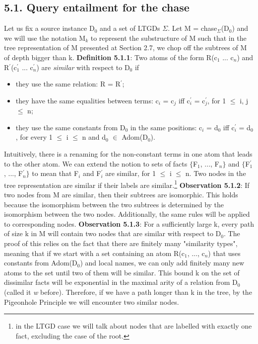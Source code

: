 \documentclass[11pt, a4paper, dvipsnames]{article}
\begin{document}
\subsection{5.1. Query entailment for the chase}
Let us fix a source instance D$_{0}$ and a set of LTGDs $\Sigma$. Let M = chase$_{\Sigma}$(D$_{0}$) and we will use the notation M$_{k}$ to represent the substructure of M such that in the tree representation of M presented at Section 2.7, we chop off the subtrees of M of depth bigger than k.\newline
\textbf{Definition 5.1.1}: Two atoms of the form R(c$_{1}$ ... c$_{n}$) and R$^{'}$(c$^{'}_{1}$ ... c$^{'}_{n}$) are \textit{similar} with respect to D$_{0}$ if
\begin{itemize}
	\item they use the same relation: R = R$^{'}$;
	\item they have the same equalities between terms: c$_{i}$ = c$_{j}$ iff c$^{'}_{i}$ = c$^{'}_{j}$, for 1 $\leq$ i, j $\leq$ n;
	\item they use the same constants from D$_{0}$ in the same positions: c$_{i}$ = d$_{0}$ iff c$^{'}_{i}$ = d$_{0}$, for every 1 $\leq$ i $\leq$ n and d$_{0}$ $\in$ Adom(D$_{0}$).
\end{itemize} 
Intuitively, there is a renaming for the non-constant terms in one atom that leads to the other atom. We can extend the notion to sets of facts $\{$F$_{1}$, ..., F$_{n}\}$ and $\{$F$^{'}_{1}$, ..., F$^{'}_{n}\}$ to mean that F$_{i}$ and F$^{'}_{i}$ are similar, for 1 $\leq$ i $\leq$ n. Two nodes in the tree representation are similar if their labels are similar.\footnote{in the LTGD case we will talk about nodes that are labelled with exactly one fact, excluding the case of the root.}\newline
\textbf{Observation 5.1.2}: If two nodes from M are similar, then their subtrees are isomorphic.\newline
This holds because the isomorphism between the two subtrees is determined by the isomorphism between the two nodes. Additionally, the same rules will be applied to corresponding nodes.\newline
\textbf{Observation 5.1.3}: For a sufficiently large k, every path of size k in M will contain two nodes that are similar with respect to D$_{0}$.\newline
The proof of this relies on the fact that there are finitely many "similarity types", meaning that if we start with a set containing an atom R(c$_{1}$, ..., c$_{n}$) that uses constants from Adom(D$_{0}$) and local names, we can only add finitely many new atoms to the set until two of them will be similar. This bound k on the set of dissimilar facts will be exponential in the maximal arity of a relation from D$_{0}$ (called it \textit{w} before). Therefore, if we have a path longer than k in the tree, by the Pigeonhole Principle we will encounter two similar nodes.\newline
\end{document}
